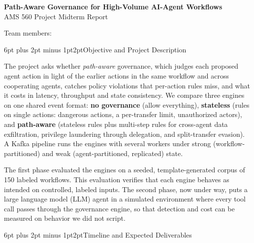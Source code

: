\documentclass[11pt]{article}
\makeatletter
\renewcommand{\section}{\@startsection{section}{1}{0pt}%
  {6pt plus 2pt minus 1pt}{2pt}{\normalfont\large\bfseries}}
\makeatother
\begin{document}
\begin{center}
  {\Large\bfseries Path-Aware Governance for High-Volume AI-Agent Workflows}\\[3pt]
  {\normalsize AMS 560 Project \textemdash{} Midterm Report}\\[1pt]
  {\small Team members: \rule{0pt}{0pt}}
\end{center}

\section{Objective and Project Description}

The project asks whether \emph{path-aware} governance, which judges each proposed agent action
in light of the earlier actions in the same workflow and across cooperating agents, catches
policy violations that per-action rules miss, and what it costs in latency, throughput and
state consistency. We compare three engines on one shared event format: \textbf{no governance}
(allow everything), \textbf{stateless} (rules on single actions: dangerous actions, a
per-transfer limit, unauthorized actors), and \textbf{path-aware} (stateless rules plus
multi-step rules for cross-agent data exfiltration, privilege laundering through delegation,
and split-transfer evasion). A Kafka pipeline runs the engines with several workers under
strong (workflow-partitioned) and weak (agent-partitioned, replicated) state.

The first phase evaluated the engines on a seeded, template-generated corpus of 150 labeled
workflows. This evaluation verifies that each engine behaves as intended on controlled,
labeled inputs. The second phase, now under way,
puts a large language model (LLM) agent in a simulated environment where every tool call
passes through the governance engine, so that detection and cost can be measured on behavior
we did not script.

\section{Timeline and Expected Deliverables}
\end{document}
